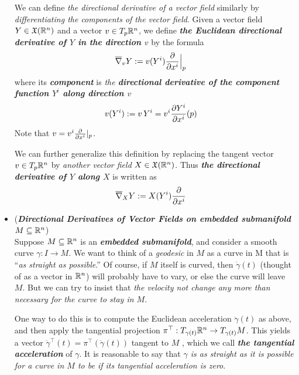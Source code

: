 \documentclass[11pt]{article}
\begin{document}
\begin{itemize}
\begin{remark}
We can define \emph{the directional derivative of a vector field} similarly by \emph{differentiating the components of the vector field}. Given a vector field $Y \in {\mathfrak X}({\mathbb R}^n)$ and a vector $v \in T_{p}{\mathbb R}^n$, we define \emph{\textbf{the Euclidean directional derivative of $Y$ in the direction $v$}} by the formula
\begin{align*}
\overline{\nabla}_{v}Y &:= v(Y^{i})\frac{\partial }{ \partial x^i}\Bigr|_{p}
\end{align*} where its \emph{\textbf{component}} is \emph{the \textbf{directional derivative of the component function $Y^i$ along direction $v$}}
\begin{align*}
v(Y^{i}) &:= v\,Y^{i} = v^i \frac{\partial Y^i}{ \partial x^i}(p)
\end{align*} Note that $v = v^i\frac{\partial }{ \partial x^i}|_{p}$.

We can further generalize this definition by replacing the tangent vector $v \in T_{p}{\mathbb R}^n$ by \emph{another vector field} $X \in  {\mathfrak X}({\mathbb R}^n)$. Thus \emph{\textbf{the directional derivative of $Y$ along $X$}} is written as
\begin{align}
\overline{\nabla}_{X}Y &:= X(Y^{i})\frac{\partial }{ \partial x^i} \label{eqn: connection_euclidean}
\end{align}
\end{remark}

\item \begin{remark} (\emph{\textbf{Directional Derivatives of Vector Fields on embedded submanifold $M \subseteq {\mathbb R}^n$}}) \citep{lee2018introduction}\\
Suppose $M \subseteq {\mathbb R}^n$ is an \emph{\textbf{embedded submanifold}}, and consider a smooth curve $\gamma: I \rightarrow M$. We want to think of a \emph{geodesic} in $M$ as a curve in M that is ``\emph{as straight as possible}.” Of course, if $M$ itself is curved, then $\dot{\gamma}(t)$ (thought of as a vector in ${\mathbb R}^n$) will probably have to vary, or else the curve will leave $M$. But we can try to insist that \emph{the velocity not change any more than necessary for the curve to stay in $M$}.  

One way to do this is to compute the Euclidean acceleration $\ddot{\gamma}(t)$ as above, and then apply the tangential projection $\pi^{\top}: T_{\gamma(t)}{\mathbb R}^{n} \rightarrow T_{\gamma(t)}M$. This yields a vector $\ddot{\gamma}^{\top}(t) = \pi^{\top}(\ddot{\gamma}(t))$ tangent to $M$ , which we call \emph{\textbf{the tangential acceleration}} of $\gamma$.  It is reasonable to say that \emph{$\gamma$ is as straight as it is possible for a curve in $M$ to be if its tangential acceleration is zero}.


\end{remark}
\end{itemize}
\end{document}
